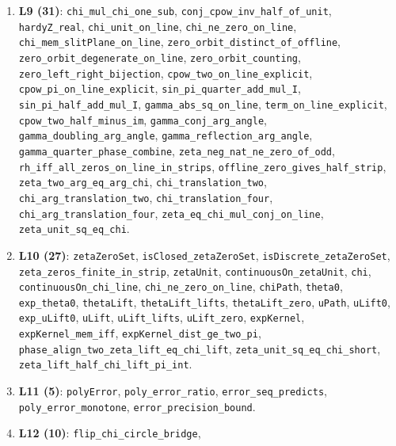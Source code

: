\documentclass{article}
\begin{document}
{\begin{sloppypar}
\begin{enumerate}
\texttt{critical\_line\_equidistant\_basepoint\_i},
\texttt{recip\_basepoint\_i\_on\_unit\_circle}, \texttt{hardyZ\_real},
\texttt{critical\_line\_positional}, \texttt{orbit\_center\_half},
\texttt{orbit\_degenerate\_iff\_on\_line},
\texttt{recip\_on\_critical\_circle\_iff}, \texttt{zero\_orbit\_four}.
\item \textbf{L9 (31)}: \texttt{chi\_mul\_chi\_one\_sub},
\texttt{conj\_cpow\_inv\_half\_of\_unit}, \texttt{hardyZ\_real},
\texttt{chi\_unit\_on\_line}, \texttt{chi\_ne\_zero\_on\_line},
\texttt{chi\_mem\_slitPlane\_on\_line}, \texttt{zero\_orbit\_distinct\_of\_offline},
\texttt{zero\_orbit\_degenerate\_on\_line}, \texttt{zero\_orbit\_counting},
\texttt{zero\_left\_right\_bijection}, \texttt{cpow\_two\_on\_line\_explicit},
\texttt{cpow\_pi\_on\_line\_explicit}, \texttt{sin\_pi\_quarter\_add\_mul\_I},
\texttt{sin\_pi\_half\_add\_mul\_I}, \texttt{gamma\_abs\_sq\_on\_line},
\texttt{term\_on\_line\_explicit}, \texttt{cpow\_two\_half\_minus\_im},
\texttt{gamma\_conj\_arg\_angle}, \texttt{gamma\_doubling\_arg\_angle},
\texttt{gamma\_reflection\_arg\_angle}, \texttt{gamma\_quarter\_phase\_combine},
\texttt{zeta\_neg\_nat\_ne\_zero\_of\_odd},
\texttt{rh\_iff\_all\_zeros\_on\_line\_in\_strips},
\texttt{offline\_zero\_gives\_half\_strip}, \texttt{zeta\_two\_arg\_eq\_arg\_chi},
\texttt{chi\_translation\_two}, \texttt{chi\_arg\_translation\_two},
\texttt{chi\_translation\_four}, \texttt{chi\_arg\_translation\_four},
\texttt{zeta\_eq\_chi\_mul\_conj\_on\_line}, \texttt{zeta\_unit\_sq\_eq\_chi}.
\item \textbf{L10 (27)}: \texttt{zetaZeroSet}, \texttt{isClosed\_zetaZeroSet},
\texttt{isDiscrete\_zetaZeroSet}, \texttt{zeta\_zeros\_finite\_in\_strip},
\texttt{zetaUnit}, \texttt{continuousOn\_zetaUnit}, \texttt{chi},
\texttt{continuousOn\_chi\_line}, \texttt{chi\_ne\_zero\_on\_line},
\texttt{chiPath}, \texttt{theta0}, \texttt{exp\_theta0}, \texttt{thetaLift},
\texttt{thetaLift\_lifts}, \texttt{thetaLift\_zero}, \texttt{uPath},
\texttt{uLift0}, \texttt{exp\_uLift0}, \texttt{uLift}, \texttt{uLift\_lifts},
\texttt{uLift\_zero}, \texttt{expKernel}, \texttt{expKernel\_mem\_iff},
\texttt{expKernel\_dist\_ge\_two\_pi},
\texttt{phase\_align\_two\_zeta\_lift\_eq\_chi\_lift},
\texttt{zeta\_unit\_sq\_eq\_chi\_short},
\texttt{zeta\_lift\_half\_chi\_lift\_pi\_int}.
\item \textbf{L11 (5)}: \texttt{polyError}, \texttt{poly\_error\_ratio},
\texttt{error\_seq\_predicts}, \texttt{poly\_error\_monotone},
\texttt{error\_precision\_bound}.
\item \textbf{L12 (10)}: \texttt{flip\_chi\_circle\_bridge},

\end{enumerate}
\end{sloppypar}}
\end{document}
